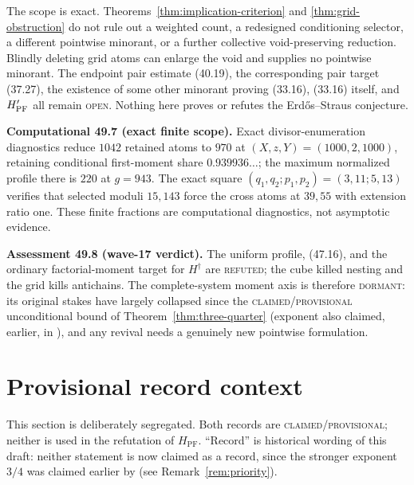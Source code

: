 \documentclass[10pt,reqno]{amsart}
\theoremstyle{definition}
\newcommand{\1}{\mathbf 1}
\newcommand{\PF}{H_{\mathrm{PF}}}
\begin{document}
The scope is exact.  Theorems~\ref{thm:implication-criterion} and
\ref{thm:grid-obstruction} do not rule out a weighted count, a redesigned
conditioning selector, a different pointwise minorant, or a further
collective void-preserving reduction.  Blindly deleting grid atoms can
enlarge the void and supplies no pointwise minorant.  The endpoint pair
estimate (40.19), the corresponding pair target (37.27), the existence of
some other minorant proving (33.16), (33.16) itself, and $H_{\rm PF}'$ all
remain \textsc{open}.  Nothing here proves or refutes the Erd\H{o}s--Straus
conjecture.

\medskip\noindent\textbf{Computational 49.7 (exact finite scope).}
Exact divisor-enumeration diagnostics reduce $1042$ retained atoms to $970$
at $(X,z,Y)=(1000,2,1000)$, retaining conditional first-moment share
$0.939936\ldots$; the maximum normalized profile there is $220$ at $g=943$.
The exact square $(q_1,q_2;p_1,p_2)=(3,11;5,13)$ verifies that selected
moduli $15,143$ force the cross atoms at $39,55$ with extension ratio one.
These finite fractions are computational diagnostics, not asymptotic
evidence.

\medskip\noindent\textbf{Assessment 49.8 (wave-17 verdict).}
The uniform profile, (47.16), and the ordinary factorial-moment target for
$H^\dagger$ are \textsc{refuted}; the cube killed nesting and the grid kills
antichains.  The complete-system moment axis is therefore \textsc{dormant}:
its original stakes have largely collapsed since the
\textsc{claimed/provisional} unconditional bound of
Theorem~\ref{thm:three-quarter} (exponent also claimed, earlier, in \cite{KRK}), and any revival needs a genuinely new
pointwise formulation.

\section{Provisional record context}\label{sec:records}
This section is deliberately segregated.  Both records are \textsc{claimed/provisional}; neither is used in the refutation of $\PF$.  ``Record'' is historical wording of this draft: neither statement is now claimed as a record, since the stronger exponent $3/4$ was claimed earlier by \cite{KRK} (see Remark~\ref{rem:priority}).
\end{document}
